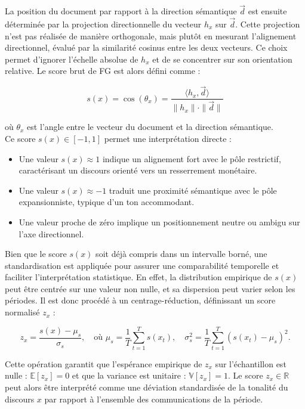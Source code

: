 La position du document par rapport à la direction sémantique $\vec{d}$ est ensuite déterminée par la projection directionnelle du vecteur $h_x$ sur $\vec{d}$. Cette projection n’est pas réalisée de manière orthogonale, mais plutôt en mesurant l’alignement directionnel, évalué par la similarité cosinus entre les deux vecteurs. Ce choix permet d’ignorer l’échelle absolue de $h_x$ et de se concentrer sur son orientation relative. Le score brut de FG est alors défini comme :

\begin{equation}
s(x) = \cos(\theta_x) = \frac{\langle h_x, \vec{d} \rangle}{\|h_x\| \cdot \|\vec{d}\|}
\end{equation}

où $\theta_x$ est l’angle entre le vecteur du document et la direction sémantique.\\

Ce score $s(x) \in [-1, 1]$ permet une interprétation directe :

\begin{itemize}
    \item Une valeur $s(x) \approx 1$ indique un alignement fort avec le pôle restrictif, caractérisant un discours orienté vers un resserrement monétaire.
    \item Une valeur $s(x) \approx -1$ traduit une proximité sémantique avec le pôle expansionniste, typique d’un ton accommodant.
    \item Une valeur proche de zéro implique un positionnement neutre ou ambigu sur l’axe directionnel.
\end{itemize}

Bien que le score $s(x)$ soit déjà compris dans un intervalle borné, une standardisation est appliquée pour assurer une comparabilité temporelle et faciliter l’interprétation statistique. En effet, la distribution empirique de $s(x)$ peut être centrée sur une valeur non nulle, et sa dispersion peut varier selon les périodes. Il est donc procédé à un centrage-réduction, définissant un score normalisé $z_x$ :

\begin{equation}
z_x = \frac{s(x) - \mu_s}{\sigma_s}, \quad \text{où } \mu_s = \frac{1}{T} \sum_{t=1}^T s(x_t), \quad \sigma_s^2 = \frac{1}{T} \sum_{t=1}^T \left(s(x_t) - \mu_s \right)^2.
\end{equation}

Cette opération garantit que l’espérance empirique de $z_x$ sur l’échantillon est nulle : $\mathbb{E}[z_x] = 0$ et que la variance est unitaire : $\mathbb{V}[z_x] = 1$. Le score $z_x \in \mathbb{R}$ peut alors être interprété comme une déviation standardisée de la tonalité du discours $x$ par rapport à l’ensemble des communications de la période.\\


